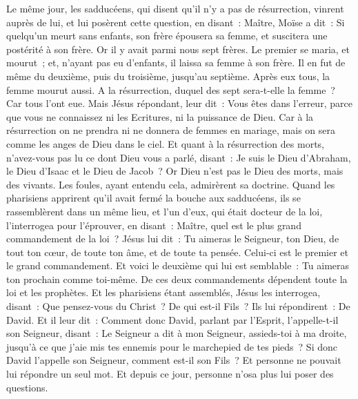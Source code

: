 \begin{multicols}{2}
Le même jour, les sadducéens, qui disent qu'il n'y a pas de résurrection, vinrent auprès de lui, et lui posèrent cette question,
en disant~: Maître, Moïse a dit~: Si quelqu'un meurt sans enfants, son frère épousera sa femme, et suscitera une postérité à son frère.
Or il y avait parmi nous sept frères. Le premier se maria, et mourut~; et, n'ayant pas eu d'enfants, il laissa sa femme à son frère.
Il en fut de même du deuxième, puis du troisième, jusqu'au septième.
Après eux tous, la femme mourut aussi.
A la résurrection, duquel des sept sera-t-elle la femme~? Car tous l'ont eue.
Mais Jésus répondant, leur dit~: Vous êtes dans l'erreur, parce que vous ne connaissez ni les Ecritures, ni la puissance de Dieu.
Car à la résurrection on ne prendra ni ne donnera de femmes en mariage, mais on sera comme les anges de Dieu dans le ciel.
Et quant à la résurrection des morts, n'avez-vous pas lu ce dont Dieu vous a parlé, disant~:
Je suis le Dieu d'Abraham, le Dieu d'Isaac et le Dieu de Jacob~? Or Dieu n'est pas le Dieu des morts, mais des vivants.
Les foules, ayant entendu cela, admirèrent sa doctrine.
Quand les pharisiens apprirent qu'il avait fermé la bouche aux sadducéens, ils se rassemblèrent dans un même lieu,
et l'un d'eux, qui était docteur de la loi, l'interrogea pour l'éprouver, en disant~:
Maître, quel est le plus grand commandement de la loi~?
Jésus lui dit~: Tu aimeras le Seigneur, ton Dieu, de tout ton cœur, de toute ton âme, et de toute ta pensée.
Celui-ci est le premier et le grand commandement.
Et voici le deuxième qui lui est semblable~: Tu aimeras ton prochain comme toi-même.
De ces deux commandements dépendent toute la loi et les prophètes.
Et les pharisiens étant assemblés, Jésus les interrogea,
disant~: Que pensez-vous du Christ~? De qui est-il Fils~? Ils lui répondirent~: De David.
Et il leur dit~: Comment donc David, parlant par l'Esprit, l'appelle-t-il son Seigneur, disant~:
Le Seigneur a dit à mon Seigneur, assieds-toi à ma droite, jusqu'à ce que j'aie mis tes ennemis pour le marchepied de tes pieds~?
Si donc David l'appelle son Seigneur, comment est-il son Fils~?
Et personne ne pouvait lui répondre un seul mot. Et depuis ce jour, personne n'osa plus lui poser des questions.

\end{multicols}
